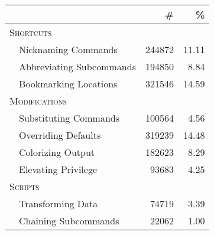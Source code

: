 \begin{tabular}{llrr}
    & & \# & \% \\
    \toprule
    \multicolumn{2}{l}{\textsc{Shortcuts}} & & \\
    & Nicknaming Commands       & \num{244872} & 11.11 \\
    & Abbreviating Subcommands  & \num{194850} &  8.84 \\
    & Bookmarking Locations     & \num{321546} & 14.59 \\
    \midrule
    \multicolumn{2}{l}{\textsc{Modifications}} & & \\
    & Substituting Commands     & \num{100564} &  4.56 \\
    & Overriding Defaults       & \num{319239} & 14.48 \\
    & Colorizing Output         & \num{182623} &  8.29 \\
    & Elevating Privilege       &  \num{93683} &  4.25 \\
    \midrule
    \multicolumn{2}{l}{\textsc{Scripts}} & & \\
    & Transforming Data         &  \num{74719} &  3.39 \\
    & Chaining Subcommands      &  \num{22062} &  1.00 \\
    \bottomrule
\end{tabular}